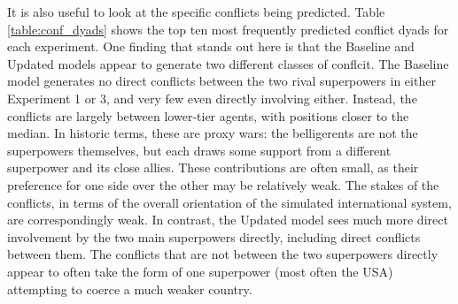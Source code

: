 It is also useful to look at the specific conflicts being predicted. Table \ref{table:conf_dyads} shows the top ten most frequently predicted conflict dyads for each experiment. One finding that stands out here is that the Baseline and Updated models appear to generate two different classes of conflcit. The Baseline model generates no direct conflicts between the two rival superpowers in either Experiment 1 or 3, and very few even directly involving either. Instead, the conflicts are largely between lower-tier agents, with positions closer to the median. In historic terms, these are proxy wars: the belligerents are not the superpowers themselves, but each draws some support from a different superpower and its close allies. These contributions are often small, as their preference for one side over the other may be relatively weak. The stakes of the conflicts, in terms of the overall orientation of the simulated international system, are correspondingly weak. In contrast, the Updated model sees much more direct involvement by the two main superpowers directly, including direct conflicts between them. The conflicts that are not between the two superpowers directly appear to often take the form of one superpower (most often the USA) attempting to coerce a much weaker country.


